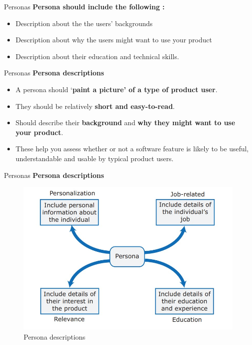 \documentclass{beamer}
\begin{document}
\begin{frame}{Personas}
	\textbf{Persona should include the following :}
	\begin{itemize}
		\item Description about the the users’ backgrounds
		\item Description about why the users might want to use your product
		\item Description about their education and technical skills.
	\end{itemize}

\end{frame}
\begin{frame}{Personas}
	\textbf{Persona descriptions}
	\begin{itemize}
		\item A persona should ‘\textbf{paint a picture’ of a type of product user}. 
		\item They should be relatively \textbf{short and easy-to-read}.
		\item Should describe their \textbf{background} and \textbf{why they might want to use your product}. 
		\item These help you assess whether or not a software feature is likely to be useful, understandable and usable by typical product users. 
		
	\end{itemize}
	
\end{frame}
\begin{frame}{Personas}
	\textbf{Persona descriptions}
	\begin{figure}
	\includegraphics[scale=.5]{img/m2_21.jpg}
	\caption{Persona descriptions}
\end{figure}
	
\end{frame}
\end{document}
